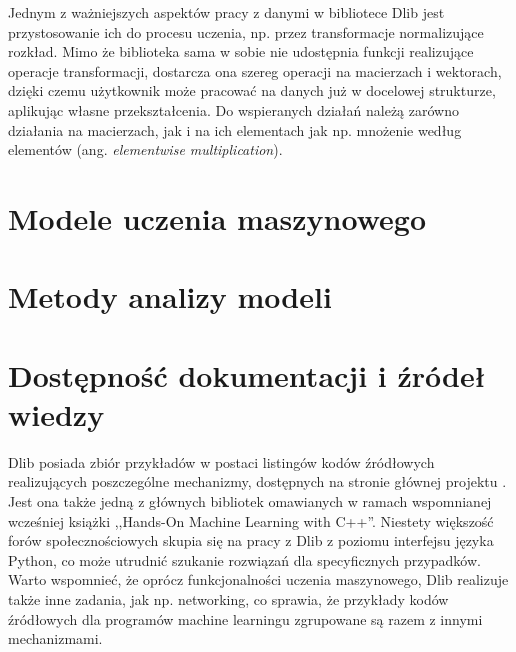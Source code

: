 Jednym z ważniejszych aspektów pracy z danymi w bibliotece Dlib jest przystosowanie ich do procesu uczenia, np. przez transformacje normalizujące rozkład. Mimo że biblioteka sama w sobie nie udostępnia funkcji realizujące operacje transformacji, dostarcza ona szereg operacji na macierzach i wektorach, dzięki czemu użytkownik może pracować na danych już w docelowej strukturze, aplikując własne przekształcenia. Do wspieranych działań należą zarówno działania na macierzach, jak i na ich elementach jak np. mnożenie według elementów (ang. \textit{elementwise multiplication}).

\section{Modele uczenia maszynowego}
\section{Metody analizy modeli}
\section{Dostępność dokumentacji i źródeł wiedzy}

Dlib posiada zbiór przykładów w postaci listingów kodów źródłowych realizujących poszczególne mechanizmy, dostępnych na stronie głównej projektu \cite{dlib:home}. Jest ona także jedną z głównych bibliotek omawianych w ramach wspomnianej wcześniej książki ,,Hands-On Machine Learning with C++''. Niestety większość forów społecznościowych skupia się na pracy z Dlib z poziomu interfejsu języka Python, co może utrudnić szukanie rozwiązań dla specyficznych przypadków. Warto wspomnieć, że oprócz funkcjonalności uczenia maszynowego, Dlib realizuje także inne zadania, jak np. networking, co sprawia, że przykłady kodów źródłowych dla programów machine learningu zgrupowane są razem z innymi mechanizmami. 
